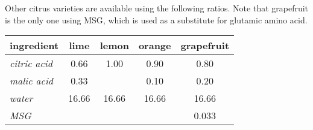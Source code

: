 \begin{variation}
\item Other citrus varieties are available using the following ratios\cite{superJuiceKosGrapefruit}\cite{superJuiceKos}.
	Note that grapefruit is the only one using \acrshort{MSG}, which is used as a substitute for glutamic amino acid\cite{superJuiceKosGrapefruitYT}.
	\begin{center}
		\begin{tabular}{lSSSS}\toprule
			\textbf{ingredient}     &  \textbf{lime} & \textbf{lemon} & \textbf{orange} & \textbf{grapefruit} \\ \midrule
			\textit{citric acid}    &           0.66 &           1.00 &            0.90 &                0.80 \\
			\textit{malic acid}     &           0.33 &                &            0.10 &                0.20 \\
			\textit{water}          &          16.66 &          16.66 &           16.66 &               16.66 \\
			\textit{\acrshort{MSG}} &                &                &                 &               0.033 \\ \bottomrule
	\end{tabular}
	\end{center}
\end{variation}


\recipeend
